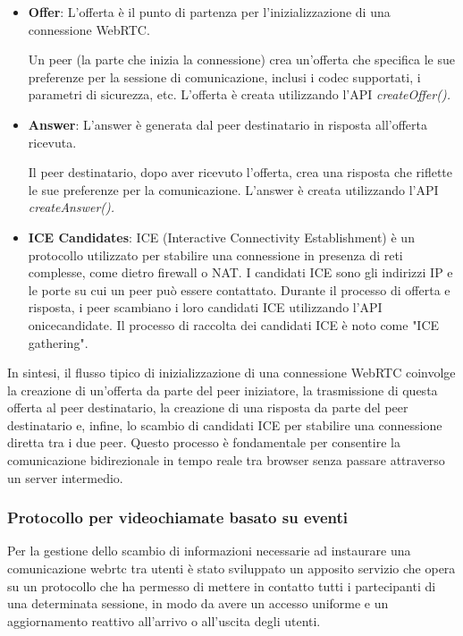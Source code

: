 \begin{itemize}
    \item \textbf{Offer}:
    L'offerta è il punto di partenza per l'inizializzazione di una connessione WebRTC.

    Un peer (la parte che inizia la connessione) crea un'offerta che specifica le sue preferenze per la sessione di comunicazione, inclusi i codec supportati, i parametri di sicurezza, etc.
    L'offerta è creata utilizzando l'API \textit{createOffer().}

    \item \textbf{Answer}:
    L'answer è generata dal peer destinatario in risposta all'offerta ricevuta.
    
    Il peer destinatario, dopo aver ricevuto l'offerta, crea una risposta che riflette le sue preferenze per la comunicazione.
    L'answer è creata utilizzando l'API \textit{createAnswer().}

    \item \textbf{ICE Candidates}:
    ICE (Interactive Connectivity Establishment) è un protocollo utilizzato per stabilire una connessione in presenza di reti complesse, come dietro firewall o NAT.
    I candidati ICE sono gli indirizzi IP e le porte su cui un peer può essere contattato.
    Durante il processo di offerta e risposta, i peer scambiano i loro candidati ICE utilizzando l'API onicecandidate.
    Il processo di raccolta dei candidati ICE è noto come "ICE gathering".
\end{itemize}

In sintesi, il flusso tipico di inizializzazione di una connessione WebRTC coinvolge la creazione di un'offerta da parte del peer iniziatore, la trasmissione di questa offerta al peer destinatario, la creazione di una risposta da parte del peer destinatario e, infine, lo scambio di candidati ICE per stabilire una connessione diretta tra i due peer.
%
Questo processo è fondamentale per consentire la comunicazione bidirezionale in tempo reale tra browser senza passare attraverso un server intermedio.

%
%
%
\subsubsection{Protocollo per videochiamate basato su eventi}

Per la gestione dello scambio di informazioni necessarie ad instaurare una comunicazione webrtc tra utenti è stato sviluppato un apposito servizio che opera su un protocollo che ha permesso di mettere in contatto tutti i partecipanti di una determinata sessione, in modo da avere un accesso uniforme e un aggiornamento reattivo all'arrivo o all'uscita degli utenti.

